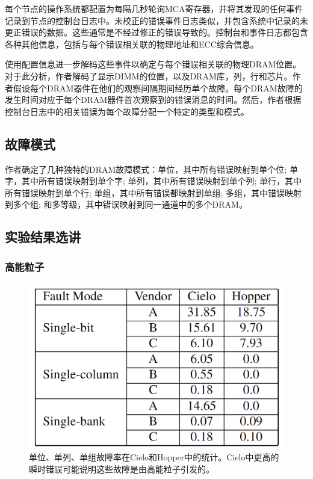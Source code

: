 \documentclass[11pt, a4paper]{article}
\begin{document}
每个节点的操作系统都配置为每隔几秒轮询MCA寄存器，并将其发现的任何事件记录到节点的控制台日志中。未校正的错误事件日志类似，并包含系统中记录的未更正错误的数据。这些通常是不经过修正的错误导致的。控制台和事件日志都包含各种其他信息，包括与每个错误相关联的物理地址和ECC综合信息。

使用配置信息进一步解码这些事件以确定与每个错误相关联的物理DRAM位置。对于此分析，作者解码了显示DIMM的位置，以及DRAM库，列，行和芯片。作者假设每个DRAM器件在他们的观察间隔期间经历单个故障。每个DRAM故障的发生时间对应于每个DRAM器件首次观察到的错误消息的时间。然后，作者根据控制台日志中的相关错误为每个故障分配一个特定的类型和模式。

\subsection{故障模式}

作者确定了几种独特的DRAM故障模式：单位，其中所有错误映射到单个位; 单字，其中所有错误映射到单个字; 单列，其中所有错误映射到单个列; 单行，其中所有错误映射到单个行; 单组，其中所有错误都映射到单组; 多组，其中错误映射到多个组; 和多等级，其中错误映射到同一通道中的多个DRAM。


\subsection{实验结果选讲}

\subsubsection{高能粒子}
\begin{figure}[H]
  \begin{center}
    \includegraphics[width=5in]{single_bit_column_bank.png}
    \caption{单位、单列、单组故障率在Cielo和Hopper中的统计。Cielo中更高的瞬时错误可能说明这些故障是由高能粒子引发的。} \label{fig:single_bit_column_bank}
  \end{center}
\end{figure}
\end{document}
